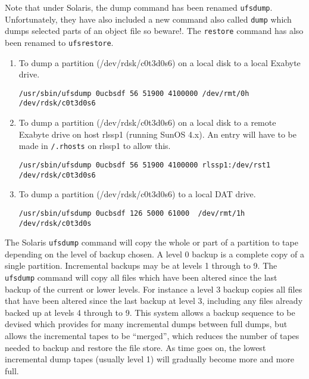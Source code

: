 Note that under Solaris, the dump command has been renamed \verb+ufsdump+.
Unfortunately, they have also included a new command also called \verb+dump+
which dumps selected parts of an object file so beware!. The {\tt restore} 
command has also been renamed to \verb+ufsrestore+. 

\begin{enumerate}

\item To dump a partition (/dev/rdsk/c0t3d0s6) on a local disk to a local 
Exabyte drive.

\begin{verbatim}
/usr/sbin/ufsdump 0ucbsdf 56 51900 4100000 /dev/rmt/0h /dev/rdsk/c0t3d0s6
\end{verbatim}

\item To dump a partition (/dev/rdsk/c0t3d0s6) on a local disk to a remote 
Exabyte drive on host rlssp1 (running SunOS 4.x). An entry will have to be 
made in {\tt /.rhosts} on rlssp1 to allow this.

\begin{small}
\begin{verbatim}
/usr/sbin/ufsdump 0ucbsdf 56 51900 4100000 rlssp1:/dev/rst1 /dev/rdsk/c0t3d0s6
\end{verbatim}
\end{small}

\item To dump a partition (/dev/rdsk/c0t3d0s6) to a local DAT drive.

\begin{verbatim}
/usr/sbin/ufsdump 0ucbsdf 126 5000 61000  /dev/rmt/1h /dev/rdsk/c0t3d0s
\end{verbatim}

\end{enumerate}

The Solaris {\tt ufsdump} command will copy the whole or part of a partition to
tape depending on the level of backup chosen. A level 0 backup is a complete 
copy of a single partition. Incremental backups may be at levels 1 through to
9. The {\tt ufsdump} command will copy all files which have been altered since
the last backup of the current or lower levels. For instance a level 3 backup
copies all files that have been altered since the last backup at level 3,
including any files already backed up at levels 4 through to 9. This system
allows a backup sequence to be devised which provides for many incremental
dumps between full dumps, but allows the incremental tapes to be ``merged'',
which reduces the number of tapes needed to backup and restore the file store.
As time goes on, the lowest incremental dump tapes (usually level 1) will
gradually become more and more full.

